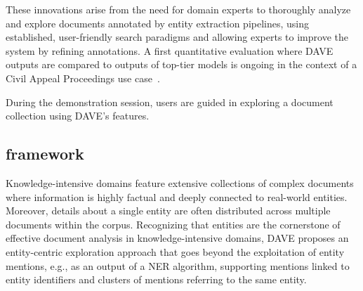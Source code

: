
These innovations arise from the need for domain experts to thoroughly analyze and explore documents annotated by entity extraction pipelines, using established, user-friendly search paradigms and allowing experts to improve the system by refining annotations. A first quantitative evaluation where DAVE outputs are compared to outputs of top-tier models is ongoing in the context of a Civil Appeal Proceedings use case~\cite{ldql}.   

During the demonstration session, users are guided in exploring a document collection using DAVE's features.


\subsection{framework}



Knowledge-intensive domains feature extensive collections of complex documents where information is highly factual and deeply connected to real-world entities. Moreover, details about a single entity are often distributed across multiple documents within the corpus. 
Recognizing that entities are the cornerstone of effective document analysis in knowledge-intensive domains, DAVE proposes an entity-centric exploration approach that %
goes beyond the exploitation of entity mentions, e.g., as an output of a NER algorithm, supporting mentions linked to entity identifiers and clusters of mentions referring to the same entity.

